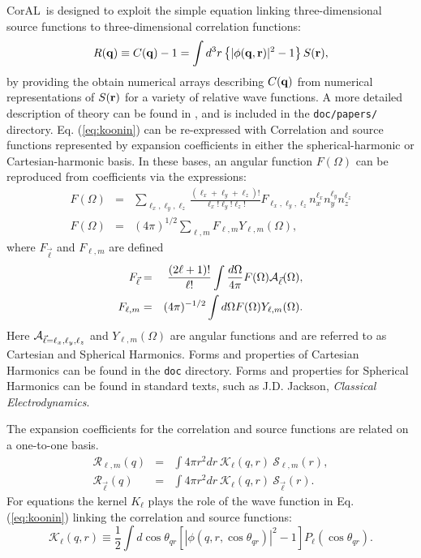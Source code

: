 \documentclass[10pt]{article}
\newcommand{\coral}{CorAL}
\begin{document}
\coral\ is designed to exploit the simple equation linking three-dimensional source functions to three-dimensional correlation functions:
\begin{equation}
\label{eq:koonin}
R({\bf q})\equiv C({\bf q})-1=\int d^3r \left\{|\phi({\bf q},{\bf r})|^2-1\right\} S({\bf r}),
\end{equation}
by providing the obtain numerical arrays describing $C({\bf q})$ from numerical representations of $S({\bf r})$ for a variety of relative wave functions. A more detailed description of theory can be found in \cite{Lisa:2005dd}, and is included in the {\tt doc/papers/} directory. Eq. (\ref{eq:koonin}) can be re-expressed with Correlation and source functions represented by expansion coefficients in either the spherical-harmonic or Cartesian-harmonic basis. In these bases, an angular function $F(\Omega)$ can be  reproduced from coefficients via the expressions:
\begin{eqnarray}
F(\Omega)&=&\sum_{\ell_x,\ell_y,\ell_z} \frac{(\ell_x+\ell_y+\ell_z)!}
{\ell_x!\ell_y!\ell_z!} F_{\ell_x,\ell_y,\ell_z}
n_x^{\ell_x}n_y^{\ell_y}n_z^{\ell_z}\\
F(\Omega)&=&(4\pi)^{1/2}\sum_{\ell,m}F_{\ell,m}Y_{\ell,m}(\Omega),
\end{eqnarray}
where $F_{\vec\ell}$ and $F_{\ell,m}$ are defined
\begin{eqnarray}
F_{\vec{\ell}}&=&\frac{(2\ell+1)!}{\ell !}\int\frac{d\Omega}{4\pi}
F(\Omega){\cal A}_{\vec{\ell}}(\Omega),\\
F_{\ell,m}&=&(4\pi)^{-1/2}\int d\Omega F(\Omega) Y_{\ell,m}(\Omega).
\end{eqnarray}
Here ${\cal A}_{\vec{\ell}=\ell_x,\ell_y,\ell_z}$ and $Y_{\ell,m}(\Omega)$ are angular functions and are referred to as Cartesian and Spherical Harmonics. Forms and properties of Cartesian Harmonics can be found in the {\tt doc} directory. Forms and properties for Spherical Harmonics can be found in standard texts, such as J.D. Jackson, {\it Classical Electrodynamics}. 

The expansion coefficients for the correlation and source functions are related on a one-to-one basis.
\begin{eqnarray}
{\mathcal R}_{\ell,m}(q)&=&\int 4\pi r^2dr~
{\mathcal K}_\ell(q,r)~{\mathcal S}_{\ell,m}(r),\\
{\mathcal R}_{\vec{\ell}}(q)
&=&\int 4\pi r^2dr~{\mathcal K}_\ell(q,r)
~{\mathcal S}_{\vec{\ell}}(r).
\end{eqnarray}
For equations the kernel $K_{\ell}$ plays the role of the wave function in Eq. (\ref{eq:koonin}) linking the correlation and source functions:
\begin{equation}
{\mathcal K}_\ell(q,r)\equiv\frac{1}{2}\int d\cos\theta_{qr} \left[
|\phi(q,r,\cos\theta_{qr})|^2-1\right] P_\ell(\cos\theta_{qr}).
\end{equation}
\end{document}
